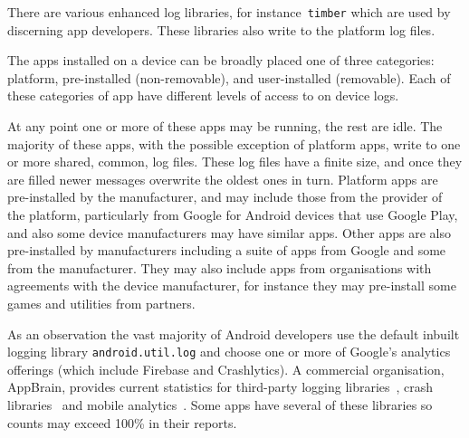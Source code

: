 There are various enhanced log libraries, for instance~\texttt{timber} which are used by discerning app developers. These libraries also write to the platform log files. 

The apps installed on a device can be broadly placed one of three categories: platform, pre-installed (non-removable), and user-installed (removable). Each of these categories of app have different levels of access to on device logs.

At any point one or more of these apps may be running, the rest are idle. The majority of these apps, with the possible exception of platform apps, write to one or more shared, common, log files. These log files have a finite size, and once they are filled newer messages overwrite the oldest ones in turn. Platform apps are pre-installed by the manufacturer, and may include those from the provider of the platform, particularly from Google for Android devices that use Google Play, and also some device manufacturers may have similar apps. Other apps are also pre-installed by manufacturers including a suite of apps from Google and some from the manufacturer. They may also include apps from organisations with agreements with the device manufacturer, for instance they may pre-install some games and utilities from partners.

As an observation the vast majority of Android developers use the default inbuilt logging library \texttt{android.util.log} and choose one or more of Google's analytics offerings (which include Firebase and Crashlytics). A commercial organisation, AppBrain, provides current statistics for third-party logging libraries~, crash libraries~ and mobile analytics~. Some apps have several of these libraries so counts may exceed 100\% in their reports.

